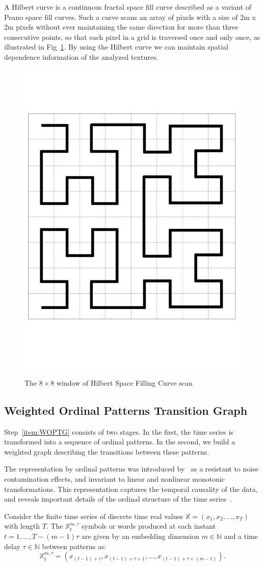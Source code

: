 \documentclass{isprs}
\begin{document}
	
	A Hilbert curve is a continuous fractal space fill curve described as a variant of Peano space fill curves.
	Such a curve scans an array of pixels with a size of 2m x 2m pixels without ever maintaining the same direction for more than three consecutive points, so that each pixel in a grid is traversed once and only once, as illustrated in Fig~\ref{fig:Hilbert}.
	By using the Hilbert curve we can maintain spatial dependence information of the analyzed textures.
	
	\begin{figure}[hbt]
		\centering
		\includegraphics[width=.3\linewidth]{Figures/hilbert.png}
		\vspace{-0.5cm}
		\caption{The $8 \times 8$ window of Hilbert Space Filling Curve scan}
		\label{fig:Hilbert}
	\end{figure}
	
	\subsection{Weighted Ordinal Patterns Transition Graph}\label{WATG}
	
	Step~\ref{item:WOPTG} consists of two stages.
	In the first, the time series is transformed into a sequence of ordinal patterns.
	In the second, we build a weighted graph describing the transitions between these patterns.
	
	The representation by ordinal patterns was introduced by~\cite{Bandt2002Permutation} as a resistant to noise contamination effects, and invariant to linear and nonlinear monotonic transformations.
	This representation captures the temporal causality of the data, and reveals important details of the ordinal structure of the time series~\citep{Larrondo2006Random}.
	
	Consider the finite time series of discrete time real values $\mathbb{X} = (x_1, x_2, \dots, x_T)$ with length $T$.
	The $\mathbb{X}_t^{m, \tau} $ symbols or words produced at each instant $t = 1, \dots, T- (m-1) \tau$ are given by an embedding dimension $m \in \mathbb{N}$ and a time delay $\tau \in \mathbb{N}$ between patterns as:
	\begin{equation}
	\mathbb{X}_t^{m,\tau} = (x_{(t-1)+\tau}, x_{(t-1)+\tau+1},\ldots, x_{(t-1)+\tau+(m-1)}).
	\end{equation}
	
\end{document}
